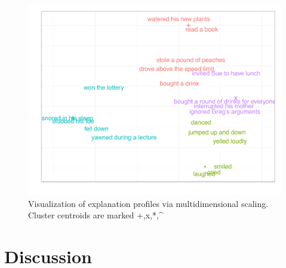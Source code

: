 \documentclass[10pt,letterpaper]{article}
\newcommand{\red}[1]{\textcolor{Red}{#1}}
\newcommand{\ndg}[1]{\textcolor{Green}{[ndg: #1]}}
\begin{document}





\begin{figure}[htb!]
\begin{center}\includegraphics[width=1\columnwidth]{images/study2MDS.pdf}\end{center}
\caption{ Visualization of explanation profiles via multidimensional scaling. Cluster centroids are marked +,x,*,\^{}}
\label{Study2MDSFig}
\end{figure}


\section{Discussion}
\end{document}
